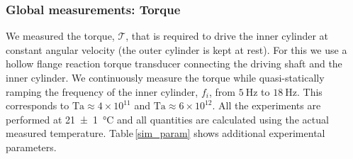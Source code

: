\subsubsection*{Global measurements: Torque}
We measured the torque, $\mathcal{T}$, that is required to drive the inner cylinder at constant angular velocity (the outer cylinder is kept at rest). For this we use a hollow flange reaction torque transducer connecting the driving shaft and the inner cylinder. We continuously measure the torque while quasi-statically ramping the frequency of the inner cylinder, $f_i$, from $\SI{5}{\hertz}$ to $\SI{18}{\hertz}$. This corresponds to $\text{Ta} \approx 4\times 10^{11}$ and $\text{Ta} \approx 6 \times 10^{12}$. All the experiments are performed at \SI[separate-uncertainty =
true,multi-part-units=single]{21(1)}{\celsius} and all quantities are calculated using the actual measured temperature. Table\,\ref{sim_param} shows additional experimental parameters.

